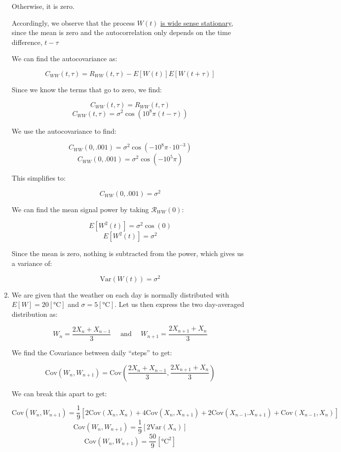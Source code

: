 \begin{enumerate}
    Otherwise, it is zero.

    Accordingly, we observe that the process $W(t)$ \underline{is wide sense stationary}, since the mean is zero and the autocorrelation only depends on the time difference, $t-\tau$

    We can find the autocovariance as:

    $$C_{WW}(t,\tau)=R_{WW}(t,\tau)-E[W(t)]E[W(t+\tau)]$$

    Since we know the terms that go to zero, we find:

    $$C_{WW}(t,\tau)=R_{WW}(t,\tau)$$
    $$\boxed{C_{WW}(t,\tau)=\sigma^2\cos(10^8\pi (t-\tau))}$$

    We use the autocovariance to find:

    $$C_{WW}(0,.001)=\sigma^2\cos\left( -10^8\pi\cdot10^{-3} \right)$$
    $$C_{WW}(0,.001)=\sigma^2\cos\left( -10^5\pi \right)$$

    This simplifies to:

    $$\boxed{C_{WW}(0,.001)=\sigma^2}$$
    
    We can find the mean signal power by taking $\mathcal{R}_{WW}(0)$:

    $$E[W^2(t)]=\sigma^2\cos\left( 0 \right)$$
    $$\boxed{E[W^2(t)]=\sigma^2}$$

    Since the mean is zero, nothing is subtracted from the power, which gives us a variance of:

    $$\boxed{\text{Var}(W(t))=\sigma^2}$$

  \item We are given that the weather on each day is normally distributed with $E[W]=20[\si{\celsius}]$ and $\sigma=5[\si{\celsius}]$. Let us then express the two day-averaged distribution as:

    $$W_n=\frac{2X_n+X_{n-1}}{3}\quad\text{ and }\quad W_{n+1}=\frac{2X_{n+1}+X_n}{3}$$

    We find the Covariance between daily ``steps'' to get:

    $$\text{Cov}(W_n,W_{n+1})=\text{Cov}\left( \frac{2X_n+X_{n-1}}{3},\frac{2X_{n+1}+X_n}{3} \right)$$

    We can break this apart to get:

    $$\text{Cov}(W_n,W_{n+1})=\frac{1}{9}\left[2\text{Cov}\left( X_n,X_n \right)+4\text{Cov}\left( X_n,X_{n+1} \right)+2\text{Cov}\left( X_{n-1}. X_{n+1} \right)+\text{Cov}(X_{n-1},X_n)\right]$$
    $$\text{Cov}(W_n,W_{n+1})=\frac{1}{9}\left[2\text{Var}\left( X_n \right)\right]$$
    $$\boxed{\text{Cov}(W_n,W_{n+1})=\frac{50}{9}\left[ \si{\celsius\squared} \right]}$$


\end{enumerate}
